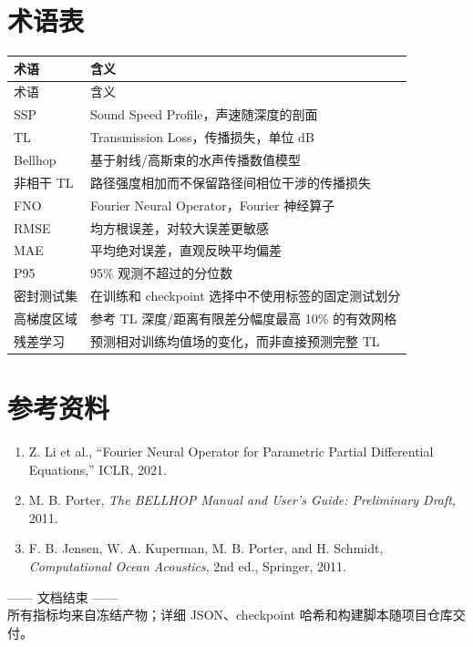 \documentclass[UTF8,12pt,openany]{ctexrep}
\begin{document}
\chapter{术语表}

\begin{longtable}{L{3.2cm}L{11.0cm}}
\toprule
术语 & 含义 \\
\midrule
\endfirsthead
\toprule
术语 & 含义 \\
\midrule
\endhead
SSP & Sound Speed Profile，声速随深度的剖面 \\
TL & Transmission Loss，传播损失，单位 dB \\
Bellhop & 基于射线/高斯束的水声传播数值模型 \\
非相干 TL & 路径强度相加而不保留路径间相位干涉的传播损失 \\
FNO & Fourier Neural Operator，Fourier 神经算子 \\
RMSE & 均方根误差，对较大误差更敏感 \\
MAE & 平均绝对误差，直观反映平均偏差 \\
P95 & 95\% 观测不超过的分位数 \\
密封测试集 & 在训练和 checkpoint 选择中不使用标签的固定测试划分 \\
高梯度区域 & 参考 TL 深度/距离有限差分幅度最高 10\% 的有效网格 \\
残差学习 & 预测相对训练均值场的变化，而非直接预测完整 TL \\
\bottomrule
\end{longtable}

\chapter{参考资料}

\begin{enumerate}
  \item Z. Li et al., ``Fourier Neural Operator for Parametric Partial Differential Equations,'' ICLR, 2021.
  \item M. B. Porter, \textit{The BELLHOP Manual and User's Guide: Preliminary Draft}, 2011.
  \item F. B. Jensen, W. A. Kuperman, M. B. Porter, and H. Schmidt, \textit{Computational Ocean Acoustics}, 2nd ed., Springer, 2011.
\end{enumerate}

\vfill
\begin{center}
\color{gray}\small
—— 文档结束 ——\\[0.5em]
所有指标均来自冻结产物；详细 JSON、checkpoint 哈希和构建脚本随项目仓库交付。
\end{center}
\end{document}
